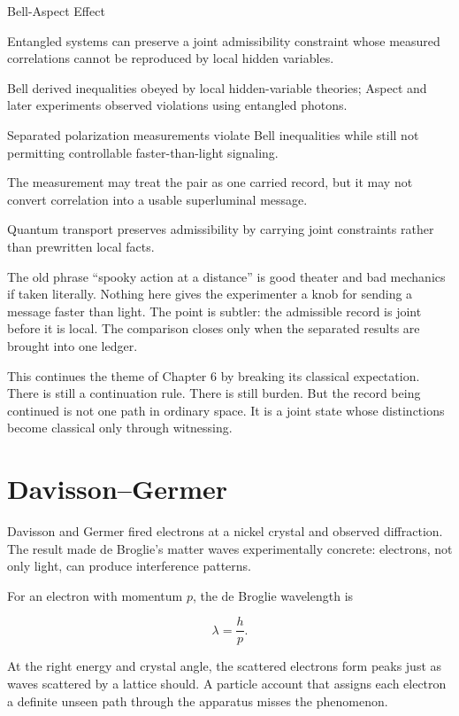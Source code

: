 \begin{phenom}{Bell-Aspect Effect}
\label{ph:bell-aspect-effect}

\PhStatement Entangled systems can preserve a joint admissibility constraint
whose measured correlations cannot be reproduced by local hidden variables.

\PhOrigin Bell derived inequalities obeyed by local hidden-variable theories;
Aspect and later experiments observed violations using entangled photons.

\PhObservation Separated polarization measurements violate Bell inequalities
while still not permitting controllable faster-than-light signaling.

\PhConstraint The measurement may treat the pair as one carried record, but it
may not convert correlation into a usable superluminal message.

\PhConsequence Quantum transport preserves admissibility by carrying joint
constraints rather than prewritten local facts.

\end{phenom}

The old phrase ``spooky action at a distance'' is good theater and bad
mechanics if taken literally. Nothing here gives the experimenter a knob for
sending a message faster than light. The point is subtler: the admissible
record is joint before it is local. The comparison closes only when the
separated results are brought into one ledger.

This continues the theme of Chapter 6 by breaking its classical expectation.
There is still a continuation rule. There is still burden. But the record being
continued is not one path in ordinary space. It is a joint state whose
distinctions become classical only through witnessing.

\section{Davisson--Germer}
\label{se:davisson-germer}

Davisson and Germer fired electrons at a nickel crystal and observed
diffraction. The result made de Broglie's matter waves experimentally concrete:
electrons, not only light, can produce interference patterns.

For an electron with momentum $p$, the de Broglie wavelength is

\[
\lambda = \frac{h}{p}.
\label{eq:chapter7-de-broglie}
\]

At the right energy and crystal angle, the scattered electrons form peaks just
as waves scattered by a lattice should. A particle account that assigns each
electron a definite unseen path through the apparatus misses the phenomenon.

